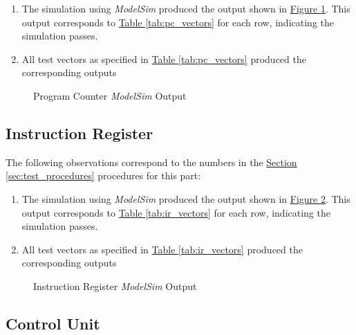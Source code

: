 \begin{enumerate}
    \item The simulation using \emph{ModelSim} produced the output shown in \hyperref[fig:pc_output]{Figure \ref*{fig:pc_output}}.
    This output corresponds to \hyperref[tab:pc_vectors]{Table \ref*{tab:pc_vectors}} for each row, indicating the simulation passes.
    \item All test vectors as specified in \hyperref[tab:pc_vectors]{Table \ref*{tab:pc_vectors}} produced the corresponding outputs
\end{enumerate}

\begin{figure}
    \caption{Program Counter \emph{ModelSim} Output\label{fig:pc_output}}
\end{figure}


\FloatBarrier \subsection{Instruction Register} %
\label{sub:instruction_register} \FloatBarrier

The following observations correspond to the numbers in the \hyperref[sec:test_procedures]{Section \ref*{sec:test_procedures}} procedures for this part:

\begin{enumerate}
    \item The simulation using \emph{ModelSim} produced the output shown in \hyperref[fig:ir_output]{Figure \ref*{fig:ir_output}}.
    This output corresponds to \hyperref[tab:ir_vectors]{Table \ref*{tab:ir_vectors}} for each row, indicating the simulation passes.
    \item All test vectors as specified in \hyperref[tab:ir_vectors]{Table \ref*{tab:ir_vectors}} produced the corresponding outputs
\end{enumerate}

\begin{figure}
    \caption{Instruction Register \emph{ModelSim} Output\label{fig:ir_output}}
\end{figure}


\FloatBarrier \subsection{Control Unit} %
\label{sub:control_unit} \FloatBarrier

